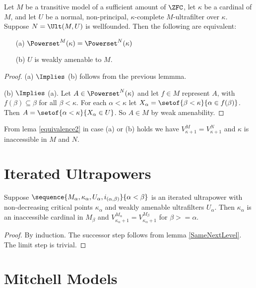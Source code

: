 \documentclass[oneside,12pt]{amsart}
\begin{document}
\begin{lemma}
\label{SameNextLevel}
Let $M$ be a transitive model of a sufficient amount of $\ZFC$, let $\kappa$ be
a cardinal of $M$, and let $U$ be a normal, non-principal, $\kappa$-complete
 $M$-ultrafilter over $\kappa$. Suppose
$N = \Ult(M, U)$ is wellfounded. Then the following are equivalent:
\begin{itemize}
\item[(a)] $\Powerset^{M}(\kappa) = \Powerset^{N}(\kappa)$

\item[(b)] $U$ is weakly amenable to $M$.
\end{itemize}
\end{lemma}
\begin{proof}
(a) $\Implies$ (b) follows from the previous lemmma.

(b) $\Implies$ (a). Let $A\in\Powerset^{N}(\kappa)$  and let $f\in M$ represent
$A$, with $f(\beta) \subseteq \beta$ for all $\beta < \kappa$. For each $\alpha<\kappa$
let $X_{\alpha} = \setof{\beta < \kappa}{\alpha \in f(\beta)}$. Then
$A = \setof{\alpha<\kappa}{X_{\alpha} \in U}$. So $A\in M$ by weak amenability.
\end{proof}

From lema \ref{equivalence2} in case (a) or (b) holds we have
$V^{M}_{\kappa+1} = V^{N}_{\kappa+1}$ and $\kappa$ is inaccessible
in $M$ and $N$.

\section{Iterated Ultrapowers}

\begin{lemma}
Suppose $\sequence{M_{\alpha}, \kappa_{\alpha}, U_{\alpha}, i_{(\alpha, \beta)}}{\alpha<\beta}$
is an iterated ultrapower with non-decreasing critical points $\kappa_{\alpha}$ and weakly amenable
ultrafilters $U_{\alpha}$. Then $\kappa_{\alpha}$ is an inaccessible cardinal in
$M_{\beta}$ and $V^{M_{\alpha}}_{\kappa_{\alpha} + 1} = V^{M_{\beta}}_{\kappa_{\alpha} + 1}$
for $\beta>=\alpha$.
\end{lemma}
\begin{proof}
By induction. The successor step follows from lemma \ref{SameNextLevel}. The limit step is trivial.
\end{proof}

\section{Mitchell Models}
\end{document}
